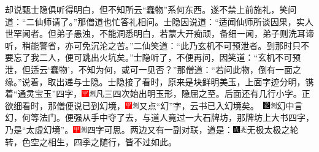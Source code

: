 却说甄士隐俱听得明白，但不知所云``蠢物''系何东西。遂不禁上前施礼，笑问道：``二仙师请了。''那僧道也忙答礼相问。士隐因说道：``适闻仙师所谈因果，实人世罕闻者。但弟子愚浊，不能洞悉明白，若蒙大开痴顽，备细一闻，弟子则洗耳谛听，稍能警省，亦可免沉沦之苦。''二仙笑道：``此乃玄机不可预泄者。到那时只不要忘了我二人，便可跳出火坑矣。''士隐听了，不便再问，因笑道：``玄机不可预泄，但适云`蠢物'，不知为何，或可一见否？''那僧道：``若问此物，倒有一面之缘。''说着，取出递与士隐。士隐接了看时，原来是块鲜明美玉，上面字迹分明，镌着``通灵宝玉''四字，{\includegraphics[width=3mm]{../Images/00002}\includegraphics[width=3mm]{../Images/00011}\footnotesize \kaishu 凡三四次始出明玉形，隐屈之至。}后面还有几行小字。正欲细看时，那僧便说已到幻境，{{\includegraphics[width=3mm]{../Images/00002}\includegraphics[width=3mm]{../Images/00011}\footnotesize \kaishu 又点``幻''字，云书已入幻境矣。　}\includegraphics[width=3mm]{../Images/00006}\includegraphics[width=3mm]{../Images/00011}\footnotesize \kaishu 幻中言幻，何等法门。}便强从手中夺了去，与道人竟过一大石牌坊，那牌坊上大书四字，乃是``太虚幻境''。{\includegraphics[width=3mm]{../Images/00002}\includegraphics[width=3mm]{../Images/00011}\footnotesize \kaishu 四字可思。}两边又有一副对联，道是：{\includegraphics[width=3mm]{../Images/00005}\includegraphics[width=3mm]{../Images/00012}\footnotesize \kaishu 无极太极之轮转，色空之相生，四季之随行，皆不过如此。}

